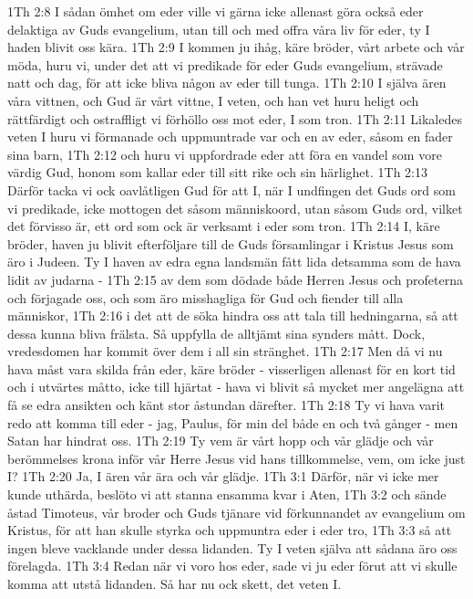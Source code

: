 1Th 2:8  I sådan ömhet om eder ville vi gärna icke allenast göra också eder delaktiga av Guds evangelium, utan till och med offra våra liv för eder, ty I haden blivit oss kära.
1Th 2:9  I kommen ju ihåg, käre bröder, vårt arbete och vår möda, huru vi, under det att vi predikade för eder Guds evangelium, strävade natt och dag, för att icke bliva någon av eder till tunga.
1Th 2:10  I själva ären våra vittnen, och Gud är vårt vittne, I veten, och han vet huru heligt och rättfärdigt och ostraffligt vi förhöllo oss mot eder, I som tron.
1Th 2:11  Likaledes veten I huru vi förmanade och uppmuntrade var och en av eder, såsom en fader sina barn,
1Th 2:12  och huru vi uppfordrade eder att föra en vandel som vore värdig Gud, honom som kallar eder till sitt rike och sin härlighet.
1Th 2:13  Därför tacka vi ock oavlåtligen Gud för att I, när I undfingen det Guds ord som vi predikade, icke mottogen det såsom människoord, utan såsom Guds ord, vilket det förvisso är, ett ord som ock är verksamt i eder som tron.
1Th 2:14  I, käre bröder, haven ju blivit efterföljare till de Guds församlingar i Kristus Jesus som äro i Judeen. Ty I haven av edra egna landsmän fått lida detsamma som de hava lidit av judarna -
1Th 2:15  av dem som dödade både Herren Jesus och profeterna och förjagade oss, och som äro misshagliga för Gud och fiender till alla människor,
1Th 2:16  i det att de söka hindra oss att tala till hedningarna, så att dessa kunna bliva frälsta. Så uppfylla de alltjämt sina synders mått. Dock, vredesdomen har kommit över dem i all sin stränghet.
1Th 2:17  Men då vi nu hava måst vara skilda från eder, käre bröder - visserligen allenast för en kort tid och i utvärtes måtto, icke till hjärtat - hava vi blivit så mycket mer angelägna att få se edra ansikten och känt stor åstundan därefter.
1Th 2:18  Ty vi hava varit redo att komma till eder - jag, Paulus, för min del både en och två gånger - men Satan har hindrat oss.
1Th 2:19  Ty vem är vårt hopp och vår glädje och vår berömmelses krona inför vår Herre Jesus vid hans tillkommelse, vem, om icke just I?
1Th 2:20  Ja, I ären vår ära och vår glädje.
1Th 3:1  Därför, när vi icke mer kunde uthärda, beslöto vi att stanna ensamma kvar i Aten,
1Th 3:2  och sände åstad Timoteus, vår broder och Guds tjänare vid förkunnandet av evangelium om Kristus, för att han skulle styrka och uppmuntra eder i eder tro,
1Th 3:3  så att ingen bleve vacklande under dessa lidanden. Ty I veten själva att sådana äro oss förelagda.
1Th 3:4  Redan när vi voro hos eder, sade vi ju eder förut att vi skulle komma att utstå lidanden. Så har nu ock skett, det veten I.
